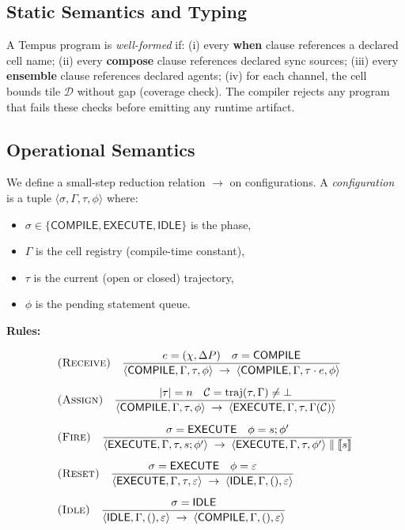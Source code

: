 \documentclass[twocolumn,10pt]{article}
\newcommand{\DP}{\Delta P}          %
\newcommand{\calC}{\mathcal{C}}     %
\newcommand{\calD}{\mathcal{D}}     %
\newcommand{\llb}{\llbracket}
\newcommand{\rrb}{\rrbracket}
\DeclareMathOperator{\traj}{traj}
\begin{document}
\subsection{Static Semantics and Typing}

A Tempus program is \emph{well-formed} if:
(i) every \textbf{when} clause references a declared cell name;
(ii) every \textbf{compose} clause references declared sync sources;
(iii) every \textbf{ensemble} clause references declared agents;
(iv) for each channel, the cell bounds tile $\calD$ without gap
  (coverage check).
The compiler rejects any program that fails these checks before
emitting any runtime artifact.

\subsection{Operational Semantics}

We define a small-step reduction relation $\to$ on configurations.
A \emph{configuration} is a tuple $\langle \sigma, \Gamma, \tau,
\phi \rangle$ where:
\begin{itemize}[leftmargin=1.5em,topsep=2pt,itemsep=1pt]
  \item $\sigma \in \{\mathsf{COMPILE},\mathsf{EXECUTE},\mathsf{IDLE}\}$
    is the phase,
  \item $\Gamma$ is the cell registry (compile-time constant),
  \item $\tau$ is the current (open or closed) trajectory,
  \item $\phi$ is the pending statement queue.
\end{itemize}

\textbf{Rules:}

\begin{align}
  &\textsc{(Receive)} \quad
  \frac{e = (\chi, \DP) \quad \sigma = \mathsf{COMPILE}}
       {\langle \mathsf{COMPILE},\Gamma,\tau,\phi\rangle
        \;\to\;
        \langle \mathsf{COMPILE},\Gamma,\tau \cdot e,\phi\rangle}
  \label{rule:recv} \\[6pt]
  &\textsc{(Assign)} \quad
  \frac{|\tau| = n \quad \calC = \traj(\tau, \Gamma) \neq \bot}
       {\langle \mathsf{COMPILE},\Gamma,\tau,\phi\rangle
        \;\to\;
        \langle \mathsf{EXECUTE},\Gamma,\tau,\Gamma(\calC)\rangle}
  \label{rule:assign} \\[6pt]
  &\textsc{(Fire)} \quad
  \frac{\sigma = \mathsf{EXECUTE} \quad \phi = s;\phi'}
       {\langle \mathsf{EXECUTE},\Gamma,\tau,s;\phi'\rangle
        \;\to\;
        \langle \mathsf{EXECUTE},\Gamma,\tau,\phi'\rangle \;\|\;
        \llb s \rrb}
  \label{rule:fire} \\[6pt]
  &\textsc{(Reset)} \quad
  \frac{\sigma = \mathsf{EXECUTE} \quad \phi = \varepsilon}
       {\langle \mathsf{EXECUTE},\Gamma,\tau,\varepsilon\rangle
        \;\to\;
        \langle \mathsf{IDLE},\Gamma,(),\varepsilon\rangle}
  \label{rule:reset} \\[6pt]
  &\textsc{(Idle)} \quad
  \frac{\sigma = \mathsf{IDLE}}
       {\langle \mathsf{IDLE},\Gamma,(),\varepsilon\rangle
        \;\to\;
        \langle \mathsf{COMPILE},\Gamma,(),\varepsilon\rangle}
  \label{rule:idle}
\end{align}
\end{document}

